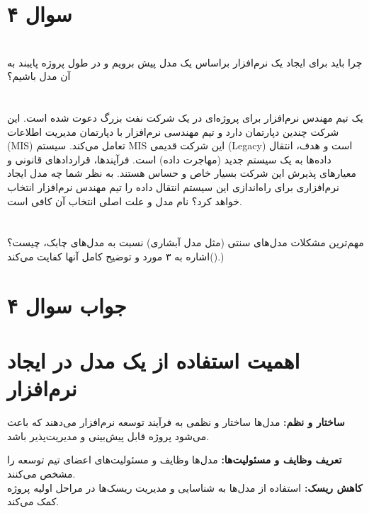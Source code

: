 \section*{سوال ۴}

\section*{}
 چرا باید برای ایجاد یک نرم‌افزار براساس یک مدل پیش برویم و در طول پروژه پایبند به آن مدل باشیم؟

\section*{}
یک تیم مهندس نرم‌افزار برای پروژه‌ای در یک شرکت نفت بزرگ دعوت شده است. این شرکت چندین دپارتمان دارد و تیم مهندسی نرم‌افزار با دپارتمان مدیریت اطلاعات (MIS) تعامل می‌کند. سیستم MIS این شرکت قدیمی (Legacy) است و هدف، انتقال داده‌ها به یک سیستم جدید (مهاجرت داده) است. فرآیندها، قراردادهای قانونی و معیارهای پذیرش این شرکت بسیار خاص و حساس هستند. به نظر شما چه مدل ایجاد نرم‌افزاری برای راه‌اندازی این سیستم انتقال داده را تیم مهندس نرم‌افزار انتخاب خواهد کرد؟ نام مدل و علت اصلی انتخاب آن کافی است.

\section*{}
مهم‌ترین مشکلات مدل‌های سنتی (مثل مدل آبشاری) نسبت به مدل‌های چابک، چیست؟ ()اشاره به ۳ مورد و توضیح کامل آنها کفایت می‌کند.)

\section*{جواب سوال ۴}

\section*{ اهمیت استفاده از یک مدل در ایجاد نرم‌افزار}
\textbf{ساختار و نظم:}
مدل‌ها ساختار و نظمی به فرآیند توسعه نرم‌افزار می‌دهند که باعث می‌شود پروژه قابل پیش‌بینی و مدیریت‌پذیر باشد.

\textbf{تعریف وظایف و مسئولیت‌ها:}
مدل‌ها وظایف و مسئولیت‌های اعضای تیم توسعه را مشخص می‌کنند. \\
\textbf{کاهش ریسک:} استفاده از مدل‌ها به شناسایی و مدیریت ریسک‌ها در مراحل اولیه پروژه کمک می‌کند.

